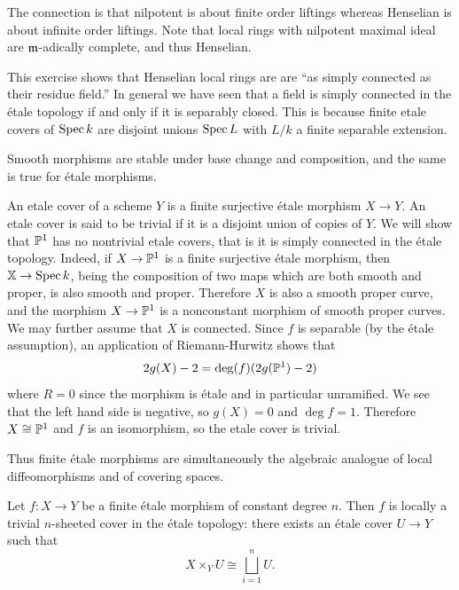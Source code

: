 \documentclass[12pt]{article}
\begin{document}
\begin{solution}
    The connection is that nilpotent is about finite order liftings whereas Henselian is about infinite order liftings. Note that local rings with nilpotent maximal ideal are $\mf m$-adically complete, and thus Henselian.
\end{solution}

This exercise shows that Henselian local rings are are “as simply connected as their residue field.” In general we have seen that a field is simply connected in the étale topology if and only if it is separably closed. This is because finite etale covers of $\Spec k$ are disjoint unions $\Spec L$ with $L/k$ a finite separable extension.


\begin{remark}
    Smooth morphisms are stable under base change and composition, and the same is true for étale morphisms.
\end{remark}

\begin{example}
    An etale cover of a scheme $Y$ is a finite surjective étale morphism $X \to Y$. An etale cover is said to be trivial if it is a disjoint union of copies of $Y$. We will show that $\P^1$ has no nontrivial etale covers, that is it is simply connected in the étale topology. Indeed, if $X \to \P^1$ is a finite surjective étale morphism, then $\X \to \Spec k$, being the composition of two maps which are both smooth and proper, is also smooth and proper. Therefore $X$ is also a smooth proper curve, and the morphism $X \to \P^1$ is a nonconstant morphism of smooth proper curves. We may further assume that $X$ is connected. Since $f$ is separable (by the étale assumption), an application of Riemann-Hurwitz shows that \begin{align*}
        2g(X)-2 = \deg(f)(2g(\P^1)-2)
    \end{align*} where $R = 0$ since the morphism is étale and in particular unramified. We see that the left hand side is negative, so $g(X) = 0$ and $\deg f = 1$. Therefore $X \cong \P^1$ and $f$ is an isomorphism, so the etale cover is trivial.
\end{example}

Thus finite étale morphisms are simultaneously the algebraic analogue of local diffeomorphisms and of covering spaces.
\begin{proposition}
    Let \(f:X\to Y\) be a finite étale morphism of constant degree \(n\). Then \(f\) is locally a trivial \(n\)-sheeted cover in the étale topology: there exists an étale cover \(U\to Y\) such that
    \[
        X\times_Y U\cong \bigsqcup_{i=1}^n U.
    \]
\end{proposition}
\end{document}
